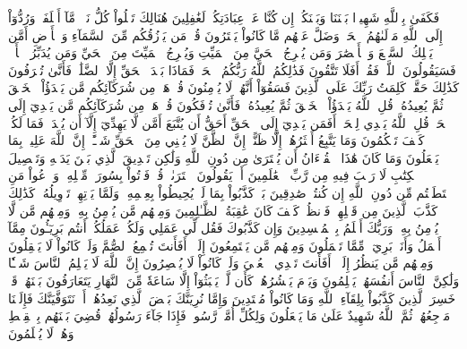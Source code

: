 فَكَفَىٰ بِٱللَّهِ شَهِيدَۢا بَيۡنَنَا وَبَيۡنَكُمۡ إِن كُنَّا عَنۡ عِبَادَتِكُمۡ لَغَٰفِلِينَ
هُنَالِكَ تَبۡلُواْ كُلُّ نَفۡسٖ مَّآ أَسۡلَفَتۡۚ وَرُدُّوٓاْ إِلَى ٱللَّهِ مَوۡلَىٰهُمُ ٱلۡحَقِّۖ وَضَلَّ عَنۡهُم مَّا كَانُواْ يَفۡتَرُونَ
قُلۡ مَن يَرۡزُقُكُم مِّنَ ٱلسَّمَآءِ وَٱلۡأَرۡضِ أَمَّن يَمۡلِكُ ٱلسَّمۡعَ وَٱلۡأَبۡصَٰرَ وَمَن يُخۡرِجُ ٱلۡحَيَّ مِنَ ٱلۡمَيِّتِ وَيُخۡرِجُ ٱلۡمَيِّتَ مِنَ ٱلۡحَيِّ وَمَن يُدَبِّرُ ٱلۡأَمۡرَۚ فَسَيَقُولُونَ ٱللَّهُۚ فَقُلۡ أَفَلَا تَتَّقُونَ
فَذَٰلِكُمُ ٱللَّهُ رَبُّكُمُ ٱلۡحَقُّۖ فَمَاذَا بَعۡدَ ٱلۡحَقِّ إِلَّا ٱلضَّلَٰلُۖ فَأَنَّىٰ تُصۡرَفُونَ
كَذَٰلِكَ حَقَّتۡ كَلِمَتُ رَبِّكَ عَلَى ٱلَّذِينَ فَسَقُوٓاْ أَنَّهُمۡ لَا يُؤۡمِنُونَ
قُلۡ هَلۡ مِن شُرَكَآئِكُم مَّن يَبۡدَؤُاْ ٱلۡخَلۡقَ ثُمَّ يُعِيدُهُۥۚ قُلِ ٱللَّهُ يَبۡدَؤُاْ ٱلۡخَلۡقَ ثُمَّ يُعِيدُهُۥۖ فَأَنَّىٰ تُؤۡفَكُونَ
قُلۡ هَلۡ مِن شُرَكَآئِكُم مَّن يَهۡدِيٓ إِلَى ٱلۡحَقِّۚ قُلِ ٱللَّهُ يَهۡدِي لِلۡحَقِّۗ أَفَمَن يَهۡدِيٓ إِلَى ٱلۡحَقِّ أَحَقُّ أَن يُتَّبَعَ أَمَّن لَّا يَهِدِّيٓ إِلَّآ أَن يُهۡدَىٰۖ فَمَا لَكُمۡ كَيۡفَ تَحۡكُمُونَ
وَمَا يَتَّبِعُ أَكۡثَرُهُمۡ إِلَّا ظَنًّاۚ إِنَّ ٱلظَّنَّ لَا يُغۡنِي مِنَ ٱلۡحَقِّ شَيۡـًٔاۚ إِنَّ ٱللَّهَ عَلِيمُۢ بِمَا يَفۡعَلُونَ
وَمَا كَانَ هَٰذَا ٱلۡقُرۡءَانُ أَن يُفۡتَرَىٰ مِن دُونِ ٱللَّهِ وَلَٰكِن تَصۡدِيقَ ٱلَّذِي بَيۡنَ يَدَيۡهِ وَتَفۡصِيلَ ٱلۡكِتَٰبِ لَا رَيۡبَ فِيهِ مِن رَّبِّ ٱلۡعَٰلَمِينَ
أَمۡ يَقُولُونَ ٱفۡتَرَىٰهُۖ قُلۡ فَأۡتُواْ بِسُورَةٖ مِّثۡلِهِۦ وَٱدۡعُواْ مَنِ ٱسۡتَطَعۡتُم مِّن دُونِ ٱللَّهِ إِن كُنتُمۡ صَٰدِقِينَ
بَلۡ كَذَّبُواْ بِمَا لَمۡ يُحِيطُواْ بِعِلۡمِهِۦ وَلَمَّا يَأۡتِهِمۡ تَأۡوِيلُهُۥۚ كَذَٰلِكَ كَذَّبَ ٱلَّذِينَ مِن قَبۡلِهِمۡۖ فَٱنظُرۡ كَيۡفَ كَانَ عَٰقِبَةُ ٱلظَّـٰلِمِينَ
وَمِنۡهُم مَّن يُؤۡمِنُ بِهِۦ وَمِنۡهُم مَّن لَّا يُؤۡمِنُ بِهِۦۚ وَرَبُّكَ أَعۡلَمُ بِٱلۡمُفۡسِدِينَ
وَإِن كَذَّبُوكَ فَقُل لِّي عَمَلِي وَلَكُمۡ عَمَلُكُمۡۖ أَنتُم بَرِيٓـُٔونَ مِمَّآ أَعۡمَلُ وَأَنَا۠ بَرِيٓءٞ مِّمَّا تَعۡمَلُونَ
وَمِنۡهُم مَّن يَسۡتَمِعُونَ إِلَيۡكَۚ أَفَأَنتَ تُسۡمِعُ ٱلصُّمَّ وَلَوۡ كَانُواْ لَا يَعۡقِلُونَ
وَمِنۡهُم مَّن يَنظُرُ إِلَيۡكَۚ أَفَأَنتَ تَهۡدِي ٱلۡعُمۡيَ وَلَوۡ كَانُواْ لَا يُبۡصِرُونَ
إِنَّ ٱللَّهَ لَا يَظۡلِمُ ٱلنَّاسَ شَيۡـٔٗا وَلَٰكِنَّ ٱلنَّاسَ أَنفُسَهُمۡ يَظۡلِمُونَ
وَيَوۡمَ يَحۡشُرُهُمۡ كَأَن لَّمۡ يَلۡبَثُوٓاْ إِلَّا سَاعَةٗ مِّنَ ٱلنَّهَارِ يَتَعَارَفُونَ بَيۡنَهُمۡۚ قَدۡ خَسِرَ ٱلَّذِينَ كَذَّبُواْ بِلِقَآءِ ٱللَّهِ وَمَا كَانُواْ مُهۡتَدِينَ
وَإِمَّا نُرِيَنَّكَ بَعۡضَ ٱلَّذِي نَعِدُهُمۡ أَوۡ نَتَوَفَّيَنَّكَ فَإِلَيۡنَا مَرۡجِعُهُمۡ ثُمَّ ٱللَّهُ شَهِيدٌ عَلَىٰ مَا يَفۡعَلُونَ
وَلِكُلِّ أُمَّةٖ رَّسُولٞۖ فَإِذَا جَآءَ رَسُولُهُمۡ قُضِيَ بَيۡنَهُم بِٱلۡقِسۡطِ وَهُمۡ لَا يُظۡلَمُونَ
